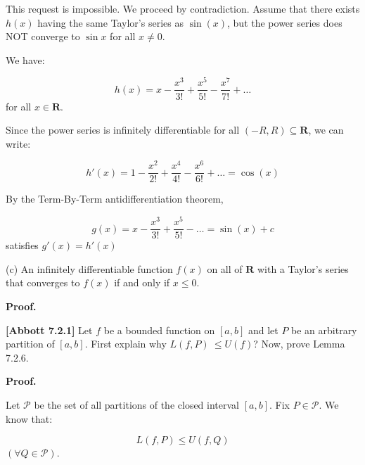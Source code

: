 \documentclass[10pt]{article}
\begin{document}
This request is impossible. We proceed by contradiction. Assume that there exists $\displaystyle h( x)$ having the same Taylor's series as $\displaystyle \sin( x)$, but the power series does NOT converge to $\displaystyle \sin x$ for all $\displaystyle x\neq 0$. \ 



We have:


\begin{equation*}
h( x) =x-\frac{x^{3}}{3!} +\frac{x^{5}}{5!} -\frac{x^{7}}{7!} +\dotsc 
\end{equation*}
for all $\displaystyle x\in \mathbf{R}$.



Since the power series is infinitely differentiable for all $\displaystyle ( -R,R) \subseteq \mathbf{R}$, we can write:


\begin{equation*}
h'( x) =1-\frac{x^{2}}{2!} +\frac{x^{4}}{4!} -\frac{x^{6}}{6!} +\dotsc =\cos( x)
\end{equation*}


By the Term-By-Term antidifferentiation theorem, 


\begin{equation*}
g( x) =x-\frac{x^{3}}{3!} +\frac{x^{5}}{5!} -\dotsc =\sin( x) +c
\end{equation*}
satisfies $\displaystyle g'( x) =h'( x)$



(c) An infinitely differentiable function $\displaystyle f( x)$ on all of $\displaystyle \mathbf{R}$ with a Taylor's series that converges to $\displaystyle f( x)$ if and only if $\displaystyle x\leq 0$.



\textbf{Proof.}



\textbf{[Abbott 7.2.1]} Let $\displaystyle f$ be a bounded function on $\displaystyle [ a,b]$ and let $\displaystyle P$ be an arbitrary partition of $\displaystyle [ a,b]$. First explain why $\displaystyle L( f,P) \ \leq U( f)$? Now, prove Lemma 7.2.6.



\textbf{Proof.}



Let $\displaystyle \mathcal{P}$ be the set of all partitions of the closed interval $\displaystyle [ a,b]$. Fix $\displaystyle P\in \mathcal{P}$. We know that:


\begin{equation*}
L( f,P) \leq U( f,Q)
\end{equation*}
$\displaystyle ( \forall Q\in \mathcal{P})$. 
\end{document}

